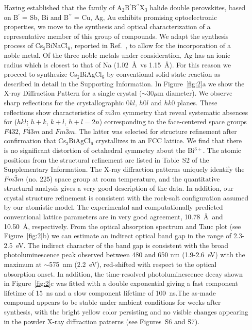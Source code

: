 \documentclass[journal=jpcl,manuscript=letter,layout=traditional]{achemso}
\begin{document}
Having established that the family of  A$_2$B$^\prime$B$^{\prime\prime}$X$_3$  halide double perovskites, based on B$^\prime$ = Sb, Bi and B$^{\prime\prime}$ = Cu,
Ag, Au exhibits promising optoelectronic properties, we move to the synthesis and optical characterization of a representative member of
this group of compounds. We adapt the synthesis process of Cs$_2$BiNaCl$_6$, reported in Ref.~\cite{Morss1972},
to allow for the incorporation of a noble metal. Of the three noble metals under consideration, Ag has an ionic radius
which is closest to that of Na (1.02~\AA\ vs 1.15~\AA). For this reason we proceed to synthesize Cs$_2$BiAgCl$_6$ by conventional solid-state
reaction as described in detail in the Supporting Information. In Figure~\ref{fig:2}a we show the X-ray Diffraction Pattern for
a single crystal ($\sim$30$\mu$m  diameter). We observe sharp reflections for the crystallographic $0kl$, $h0l$ and $hk0$ planes. These reflections show
characteristics of $m$$\bar{3}$$m$ symmetry that reveal systematic absences for ($hkl$; $h+k$, $k+l$, $h+l = 2n$) corresponding to the face-centered space groups $F432$,
$F\bar{4}3m$ and $Fm\bar{3}m$. The latter was selected for structure refinement after confirmation that Cs$_2$BiAgCl$_6$ crystallizes in an FCC
lattice. We find that there is no significant distortion of octahedral symmetry about the Bi$^{3+}$. The atomic
positions from the structural refinement are listed in Table~S2 of the Supplementary Information. The X-ray diffraction patterns uniquely
identify the $Fm\bar{3}m$ (no. 225) space group at room temperature, and the quantitative structural analysis gives a very good description of the data. In addition, our crystal structure refinement is  consistent with the rock-salt configuration
assumed by our atomistic model. The experimental and computationally predicted conventional lattice parameters are in very good agreement, 10.78~\AA\
and 10.50~\AA, respectively.
From the optical absorption spectrum and Tauc plot (see Figure~\ref{fig:2}b) we can estimate an indirect optical band gap in the range
of 2.3-2.5~eV. The indirect character of the band gap is consistent with the broad photoluminescence peak observed between 480 and 650 nm (1.9-2.6~eV)
with the maximum at $\sim$575~nm (2.2~eV), red-shifted with respect to the optical absorption onset. In addition, the  time-resolved
photoluminescence decay shown in Figure~\ref{fig:2}c was fitted with a double exponential giving a fast component
lifetime of 15~ns and a slow component lifetime of 100~ns.The as-made compound appears to be stable under ambient conditions for weeks after synthesis, with the bright yellow color persisting and no visible changes appearing in the powder X-ray diffraction patterns (see Figures~S6 and S7).
\end{document}
